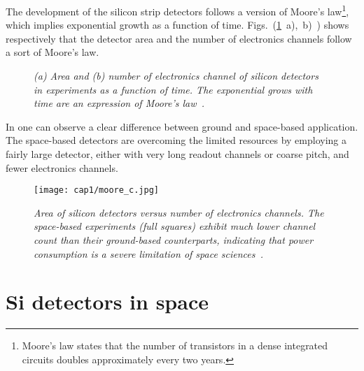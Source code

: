 The development of the silicon strip detectors follows a version of Moore's
law\footnote{Moore's law states that the number of transistors in a dense
  integrated circuits doubles approximately every two years.}, which implies
exponential growth as a function of time. Figs.~(\ref{moore}~a),~b)~) shows
respectively that the detector area and the number of electronics channels
follow a sort of Moore's law.
\begin{figure}[!htbp]
  \centering {} 
  \caption{\textit{(a) Area and (b) number of electronics channel of silicon
      detectors in experiments as a function of time. The exponential grows with
      time are an expression of Moore's law~\cite{Sadrozinski}.}}\label{moore}
\end{figure}
In  one can observe a clear difference between ground and
space-based application. The space-based detectors are overcoming the limited
resources by employing a fairly large detector, either with very long readout
channels or coarse pitch, and fewer electronics channels.
\begin{figure}[!htbp]
  \centering
  \texttt{[image: cap1/moore\_c.jpg]}
  \caption{\textit{Area of silicon detectors versus number of electronics
      channels. The space-based experiments (full squares) exhibit much lower
      channel count than their ground-based counterparts, indicating that power
      consumption is a severe limitation of space
      sciences~\cite{Sadrozinski}.}}\label{moore_c}
\end{figure}





\section{Si detectors in space}
\label{sec:si_spazio}

